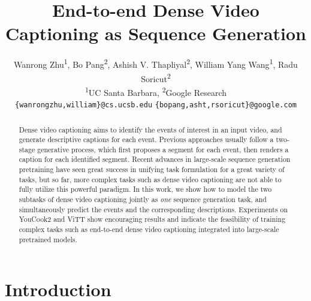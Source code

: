 \documentclass[11pt]{article}
\title{End-to-end Dense Video Captioning as Sequence Generation}
\author{
Wanrong Zhu\textsuperscript{1}, 
Bo Pang\textsuperscript{2},
Ashish V. Thapliyal\textsuperscript{2}, 
William Yang Wang\textsuperscript{1}, 
Radu Soricut\textsuperscript{2} \\
\textsuperscript{1}UC Santa Barbara, 
\textsuperscript{2}Google Research\\
\texttt{\small \{wanrongzhu,william\}@cs.ucsb.edu}
\texttt{\small \{bopang,asht,rsoricut\}@google.com}
}
\begin{document}
\maketitle

\newcommand{\TODO}[1]{\textcolor{red}{[TODO]: #1}}
\newcommand{\partitiontask}[0]{modified dense video captioning\xspace}
\newcommand{\partitionsetting}[0]{modified setting\xspace}
\newcommand{\Partitiontask}[0]{Modified dense video captioning\xspace}
\newcommand{\Vanilla}{Original\xspace}
\newcommand{\vanilla}{original\xspace}
\newcommand{\Hardencoding}[0]{Tagging-based\xspace}
\newcommand{\Offsetbased}[0]{Length-based\xspace}
\newcommand{\hardencoding}[0]{tagging-based\xspace}
\newcommand{\offsetbased}[0]{length-based\xspace}
\newcommand{\timestampbased}[0]{Timestamp markers\xspace}
\newcommand{\TemporalEmb}{Temporal embedding\xspace}
\newcommand{\temporalEmb}{temporal embedding\xspace}
\newcommand{\TemporalEmbShort}{Emb\textsubscript{\sc{Time}}\xspace}
\newcommand{\SimpleConcat}{Simple Concatenation\xspace}
\newcommand{\SimpleConcatShort}{SimpleConcat\xspace}
\newcommand{\notemporal}{\SimpleConcatShort}
\newcommand{\timeanchorShort}{T-marker\xspace}
\newcommand{\withtemporal}{+ \TemporalEmbShort}
\newcommand{\withanchor}{+ \timeanchorShort}
\newcommand{\segonly}{Seg-only model\xspace}
\newcommand{\segcap}{Seg+Cap model\xspace}
\newcommand{\sep}{sep}
\newcommand{\pad}{pad}



\begin{abstract}
Dense video captioning aims to identify the events of interest in an input video, and generate descriptive captions for each event.
Previous approaches usually follow a two-stage generative process, which first proposes a segment for each event, then renders a caption for each identified segment.
Recent advances in large-scale sequence generation pretraining have seen great success in unifying task formulation for a great variety of tasks, but so far, more complex tasks such as dense video captioning are not able to fully utilize this powerful paradigm.
In this work, we show how to model the two subtasks of dense video captioning jointly as {\em one} sequence generation task, and simultaneously predict the events and the corresponding descriptions.
Experiments on YouCook2 and ViTT show encouraging results and indicate the feasibility of training complex tasks such as end-to-end dense video captioning integrated into large-scale pretrained models.
\end{abstract} \section{Introduction}
\end{document}
